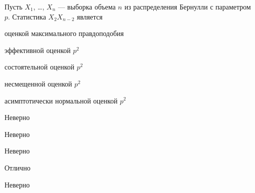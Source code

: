 
\begin{question}
Пусть \(X_1\), \ldots, \(X_n\) --- выборка объема \(n\) из распределения
Бернулли с параметром \(p\). Статистика \(X_2 X_{n-2}\) является
\begin{answerlist}
  \item оценкой максимального правдоподобия
  \item эффективной оценкой \(p^2\)
  \item состоятельной оценкой \(p^2\)
  \item несмещенной оценкой \(p^2\)
  \item асимптотически нормальной оценкой \(p^2\)
\end{answerlist}
\end{question}

\begin{solution}
\begin{answerlist}
  \item Неверно
  \item Неверно
  \item Неверно
  \item Отлично
  \item Неверно
\end{answerlist}
\end{solution}

